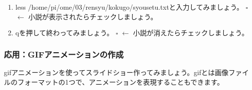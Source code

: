 \documentclass[a4paper,dvipdfmx]{jarticle}
\begin{document}
\begin{enumerate}
\item less\textcolor[rgb]{1.0,0.2,0.2}{
}/home/pi/ome/03/rensyu/kokugo/syousetu.txtと入力してみましょう。\newline
${\square}$ $\leftarrow $
小説が表示されたらチェックしましょう。
\item qを押して終わってみましょう。\newline
${\square}$ $\leftarrow $
小説が消えたらチェックしましょう。
\end{enumerate}
\subsubsection*{}
\subsubsection{}
\clearpage\subsubsection{応用：GIFアニメーションの作成}
gifアニメーションを使ってスライドショー作ってみましょう。gifとは画像ファイルのフォーマットの1つで、アニメーションを表現することもできます。
\end{document}

